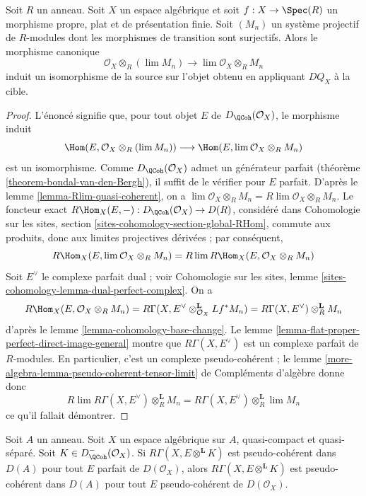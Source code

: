 \begin{lemma}
\label{lemma-pullback-and-limits}
Soit $R$ un anneau. Soit $X$ un espace alg\'ebrique et soit
$f : X \to \Spec(R)$ un morphisme propre, plat et
de pr\'esentation finie. Soit $(M_n)$ un syst\`eme projectif
de $R$-modules dont les morphismes de transition sont surjectifs.
Alors le morphisme canonique
$$
\mathcal{O}_X \otimes_R (\lim M_n)
\longrightarrow
\lim \mathcal{O}_X \otimes_R M_n
$$
induit un isomorphisme de la source sur l'objet obtenu en appliquant $DQ_X$
\`a la cible.
\end{lemma}

\begin{proof}
L'\'enonc\'e signifie que, pour tout objet $E$ de
$D_\QCoh(\mathcal{O}_X)$, le morphisme induit
$$
\Hom(E, \mathcal{O}_X \otimes_R (\lim M_n))
\longrightarrow
\Hom(E, \lim \mathcal{O}_X \otimes_R M_n)
$$
est un isomorphisme. Comme $D_\QCoh(\mathcal{O}_X)$ admet
un g\'en\'erateur parfait (th\'eor\`eme \ref{theorem-bondal-van-den-Bergh}),
il suffit de le v\'erifier pour $E$ parfait.
D'apr\`es le lemme \ref{lemma-Rlim-quasi-coherent}, on a
$\lim \mathcal{O}_X \otimes_R M_n = R\lim \mathcal{O}_X \otimes_R M_n$.
Le foncteur exact
$R\Hom_X(E, -) : D_\QCoh(\mathcal{O}_X) \to D(R)$,
consid\'er\'e dans Cohomologie sur les sites, section
\ref{sites-cohomology-section-global-RHom}, commute aux produits, donc aux
limites projectives d\'eriv\'ees ; par cons\'equent,
$$
R\Hom_X(E, \lim \mathcal{O}_X \otimes_R M_n) =
R\lim R\Hom_X(E, \mathcal{O}_X \otimes_R M_n)
$$
Soit $E^\vee$ le complexe parfait dual ; voir
Cohomologie sur les sites, lemme \ref{sites-cohomology-lemma-dual-perfect-complex}.
On a
$$
R\Hom_X(E, \mathcal{O}_X \otimes_R M_n) =
R\Gamma(X, E^\vee \otimes_{\mathcal{O}_X}^\mathbf{L} Lf^*M_n) =
R\Gamma(X, E^\vee) \otimes_R^\mathbf{L} M_n
$$
d'apr\`es le lemme \ref{lemma-cohomology-base-change}.
Le lemme \ref{lemma-flat-proper-perfect-direct-image-general} montre que
$R\Gamma(X, E^\vee)$ est un complexe parfait de $R$-modules.
En particulier, c'est un complexe pseudo-coh\'erent ; le
lemme \ref{more-algebra-lemma-pseudo-coherent-tensor-limit} de Compl\'ements
d'alg\`ebre donne donc
$$
R\lim R\Gamma(X, E^\vee) \otimes_R^\mathbf{L} M_n =
R\Gamma(X, E^\vee) \otimes_R^\mathbf{L} \lim M_n
$$
ce qu'il fallait d\'emontrer.
\end{proof}

\begin{lemma}
\label{lemma-perfect-enough}
Soit $A$ un anneau. Soit $X$ un espace alg\'ebrique sur $A$, quasi-compact
et quasi-s\'epar\'e. Soit $K \in D^-_\QCoh(\mathcal{O}_X)$.
Si $R\Gamma(X, E \otimes^\mathbf{L} K)$ est pseudo-coh\'erent
dans $D(A)$ pour tout $E$ parfait de $D(\mathcal{O}_X)$,
alors $R\Gamma(X, E \otimes^\mathbf{L} K)$ est pseudo-coh\'erent
dans $D(A)$ pour tout $E$ pseudo-coh\'erent de $D(\mathcal{O}_X)$.
\end{lemma}

